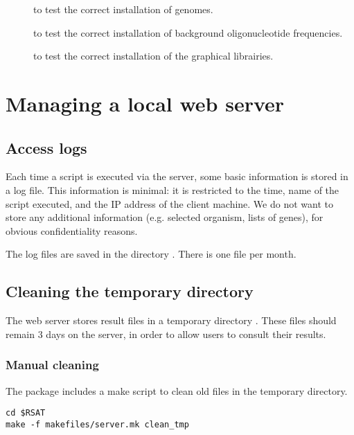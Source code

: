 \documentclass[12pt,a4paper, twoside]{scrreprt} %
\begin{document}
\begin{description}
\item[] to test the correct installation of genomes. 

\item[] to test the correct installation of
background oligonucleotide frequencies.

\item[] to test the correct installation of the
graphical librairies.

\end{description}

\section{Managing a local web server}

\subsection{Access logs}

Each time a script is executed via the \RSAT server, some basic
information is stored in a log file. This information is minimal: it
is restricted to the time, name of the script executed, and the IP
address of the client machine. We do not want to store any additional
information (e.g. selected organism, lists of genes), for obvious
confidentiality reasons.

The log files are saved in the directory . There
is one file per month.


\subsection{Cleaning the temporary directory}

The web server stores result files in a temporary directory
. These files should remain 3 days on
the server, in order to allow users to consult their results.

\subsubsection{Manual cleaning}

The \RSAT package includes a make script to clean old files in the
temporary directory.

\begin{lstlisting}
cd $RSAT
make -f makefiles/server.mk clean_tmp
\end{lstlisting}
\end{document}
